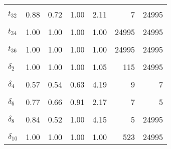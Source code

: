 \begin{table}
\begin{tabular}[t]{lrrrrrr}
\cellcolor{gray!6}{$t_{31}$} & \cellcolor{gray!6}{0.70} & \cellcolor{gray!6}{0.54} & \cellcolor{gray!6}{1.00} & \cellcolor{gray!6}{4.19} & \cellcolor{gray!6}{6} & \cellcolor{gray!6}{24995}\\
$t_{32}$ & 0.88 & 0.72 & 1.00 & 2.11 & 7 & 24995\\
\cellcolor{gray!6}{$t_{33}$} & \cellcolor{gray!6}{0.90} & \cellcolor{gray!6}{0.72} & \cellcolor{gray!6}{1.00} & \cellcolor{gray!6}{3.41} & \cellcolor{gray!6}{5} & \cellcolor{gray!6}{24995}\\
$t_{34}$ & 1.00 & 1.00 & 1.00 & 1.00 & 24995 & 24995\\
\cellcolor{gray!6}{$t_{35}$} & \cellcolor{gray!6}{1.00} & \cellcolor{gray!6}{1.00} & \cellcolor{gray!6}{1.00} & \cellcolor{gray!6}{1.00} & \cellcolor{gray!6}{24995} & \cellcolor{gray!6}{24995}\\
$t_{36}$ & 1.00 & 1.00 & 1.00 & 1.00 & 24995 & 24995\\
\cellcolor{gray!6}{$\delta_{1}$} & \cellcolor{gray!6}{1.00} & \cellcolor{gray!6}{1.00} & \cellcolor{gray!6}{1.00} & \cellcolor{gray!6}{1.06} & \cellcolor{gray!6}{50} & \cellcolor{gray!6}{24995}\\
$\delta_{2}$ & 1.00 & 1.00 & 1.00 & 1.05 & 115 & 24995\\
\cellcolor{gray!6}{$\delta_{3}$} & \cellcolor{gray!6}{0.92} & \cellcolor{gray!6}{0.76} & \cellcolor{gray!6}{1.00} & \cellcolor{gray!6}{2.10} & \cellcolor{gray!6}{7} & \cellcolor{gray!6}{24995}\\
$\delta_{4}$ & 0.57 & 0.54 & 0.63 & 4.19 & 9 & 7\\
\cellcolor{gray!6}{$\delta_{5}$} & \cellcolor{gray!6}{1.00} & \cellcolor{gray!6}{1.00} & \cellcolor{gray!6}{1.00} & \cellcolor{gray!6}{1.00} & \cellcolor{gray!6}{523} & \cellcolor{gray!6}{24995}\\
$\delta_{6}$ & 0.77 & 0.66 & 0.91 & 2.17 & 7 & 5\\
\cellcolor{gray!6}{$\delta_{7}$} & \cellcolor{gray!6}{1.00} & \cellcolor{gray!6}{1.00} & \cellcolor{gray!6}{1.00} & \cellcolor{gray!6}{1.00} & \cellcolor{gray!6}{523} & \cellcolor{gray!6}{24995}\\
$\delta_{8}$ & 0.84 & 0.52 & 1.00 & 4.15 & 5 & 24995\\
\cellcolor{gray!6}{$\delta_{9}$} & \cellcolor{gray!6}{1.00} & \cellcolor{gray!6}{1.00} & \cellcolor{gray!6}{1.00} & \cellcolor{gray!6}{1.00} & \cellcolor{gray!6}{523} & \cellcolor{gray!6}{24995}\\
$\delta_{10}$ & 1.00 & 1.00 & 1.00 & 1.00 & 523 & 24995\\

\end{tabular}
\end{table}
